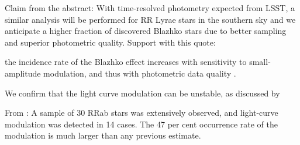 Claim from the abstract: With time-resolved photometry expected from LSST, a similar analysis will be performed for
RR Lyrae stars in the southern sky and we anticipate a higher fraction of discovered Blazhko stars due to better sampling
and superior photometric quality.  Support with this quote:

the incidence rate of the Blazhko effect increases with sensitivity to small-amplitude modulation, and thus with
photometric data quality \citep{2009MNRAS.400.1006J}.

 
We confirm that the light curve modulation can be unstable, as discussed by \cite{2009MNRAS.400.1006J} 



From \cite{2009MNRAS.400.1006J}: A sample of 30 RRab stars was extensively observed, and light-curve modulation was detected in 14 cases. The 47 per cent occurrence rate of the modulation is much larger than any previous estimate. 